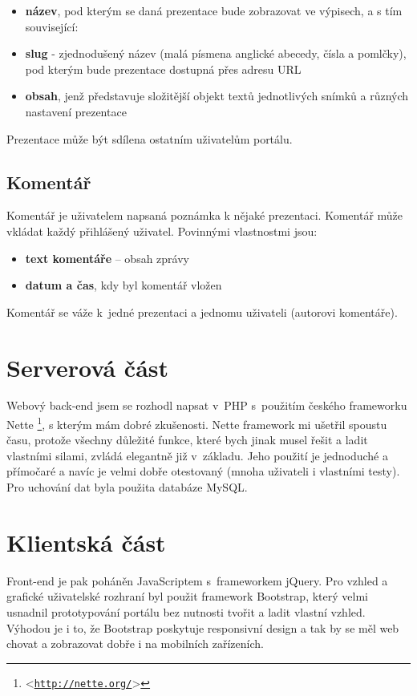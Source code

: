 \documentclass[11pt,twoside,a4paper]{book}
\let\oldUrl\url									%
\renewcommand\url[1]{<\texttt{\oldUrl{#1}}>}
\begin{document}
\begin{itemize}
	\item \textbf{název}, pod kterým se daná prezentace bude zobrazovat ve výpisech, a s tím související:
	\item \textbf{slug} - zjednodušený název (malá písmena anglické abecedy, čísla a pomlčky), pod kterým bude prezentace dostupná přes adresu URL
	\item \textbf{obsah}, jenž představuje složitější objekt textů jednotlivých snímků a různých nastavení prezentace
\end{itemize}
Prezentace může být sdílena ostatním uživatelům portálu.

\subsection{Komentář}
Komentář je uživatelem napsaná poznámka k nějaké prezentaci. Komentář může vkládat každý přihlášený uživatel. Povinnými
vlastnostmi jsou:

\begin{itemize}
	\item \textbf{text komentáře} – obsah zprávy
	\item \textbf{datum a čas}, kdy byl komentář vložen
\end{itemize}
Komentář se váže k~jedné prezentaci a jednomu uživateli (autorovi komentáře).



\section{Serverová část}
Webový back-end jsem se rozhodl napsat v~PHP s~použitím českého frameworku Nette \footnote{\url{http://nette.org/}}, s kterým mám dobré zkušenosti. Nette framework mi ušetřil spoustu času, protože všechny důležité funkce, které bych jinak musel řešit a ladit vlastními silami, zvládá elegantně již v~základu. Jeho použití je jednoduché a přímočaré a navíc je velmi dobře otestovaný (mnoha uživateli i vlastními testy). Pro uchování dat byla použita databáze MySQL.


\section{Klientská část}
Front-end je pak poháněn JavaScriptem s~frameworkem jQuery. Pro vzhled a grafické uživatelské rozhraní byl použit framework Bootstrap, který velmi usnadnil prototypování portálu bez nutnosti tvořit a ladit vlastní vzhled. Výhodou je i to, že Bootstrap poskytuje responsivní design a tak by se měl web chovat a zobrazovat dobře i na mobilních zařízeních.
\end{document}
